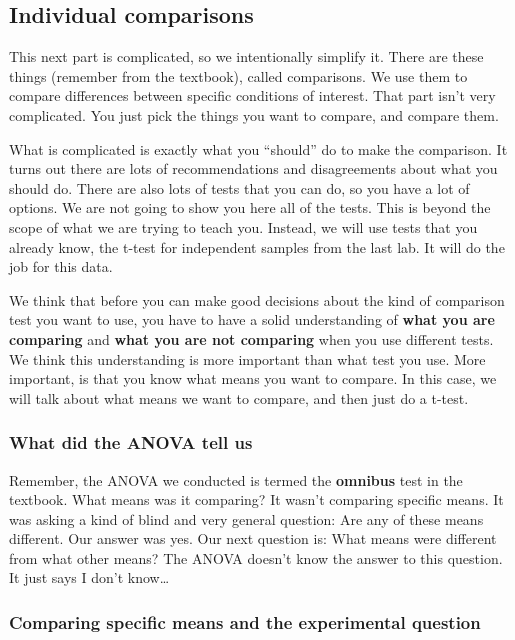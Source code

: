 \documentclass[]{book}
\theoremstyle{definition}
\theoremstyle{definition}
\theoremstyle{definition}
\theoremstyle{remark}
\begin{document}
\subsection{Individual comparisons}\label{individual-comparisons}

This next part is complicated, so we intentionally simplify it. There
are these things (remember from the textbook), called comparisons. We
use them to compare differences between specific conditions of interest.
That part isn't very complicated. You just pick the things you want to
compare, and compare them.

What is complicated is exactly what you ``should'' do to make the
comparison. It turns out there are lots of recommendations and
disagreements about what you should do. There are also lots of tests
that you can do, so you have a lot of options. We are not going to show
you here all of the tests. This is beyond the scope of what we are
trying to teach you. Instead, we will use tests that you already know,
the t-test for independent samples from the last lab. It will do the job
for this data.

We think that before you can make good decisions about the kind of
comparison test you want to use, you have to have a solid understanding
of \textbf{what you are comparing} and \textbf{what you are not
comparing} when you use different tests. We think this understanding is
more important than what test you use. More important, is that you know
what means you want to compare. In this case, we will talk about what
means we want to compare, and then just do a t-test.

\subsubsection{What did the ANOVA tell
us}\label{what-did-the-anova-tell-us}

Remember, the ANOVA we conducted is termed the \textbf{omnibus} test in
the textbook. What means was it comparing? It wasn't comparing specific
means. It was asking a kind of blind and very general question: Are any
of these means different. Our answer was yes. Our next question is: What
means were different from what other means? The ANOVA doesn't know the
answer to this question. It just says I don't know\ldots{}

\subsubsection{Comparing specific means and the experimental
question}\label{comparing-specific-means-and-the-experimental-question}
\end{document}
